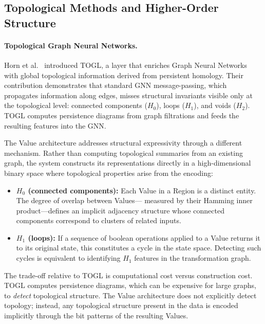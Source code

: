 \subsection{Topological Methods and Higher-Order Structure}
\label{sec:related_topological_nn}

\paragraph{Topological Graph Neural Networks.}
Horn et al.\ \citep{horn2022togl} introduced TOGL, a layer that enriches
Graph Neural Networks with global topological information derived from
persistent homology.  Their contribution demonstrates that standard GNN
message-passing, which propagates information along edges, misses
structural invariants visible only at the topological level: connected
components ($H_0$), loops ($H_1$), and voids ($H_2$).  TOGL computes
persistence diagrams from graph filtrations and feeds the resulting
features into the GNN.

The Value architecture addresses structural expressivity through a
different mechanism.  Rather than computing topological summaries from an
existing graph, the system constructs its representations directly in a
high-dimensional binary space where topological properties arise from
the encoding:

\begin{itemize}[nosep]
  \item \textbf{$H_0$ (connected components):} Each Value in a Region
        is a distinct entity.  The degree of overlap between Values---
        measured by their Hamming inner product---defines an implicit
        adjacency structure whose connected components correspond to
        clusters of related inputs.
  \item \textbf{$H_1$ (loops):} If a sequence of boolean operations
        applied to a Value returns it to its original state, this
        constitutes a cycle in the state space.  Detecting such cycles
        is equivalent to identifying $H_1$ features in the
        transformation graph.
\end{itemize}

The trade-off relative to TOGL is computational cost versus
construction cost.  TOGL computes persistence diagrams, which can be
expensive for large graphs, to \emph{detect} topological structure.
The Value architecture does not explicitly detect topology; instead,
any topological structure present in the data is encoded implicitly
through the bit patterns of the resulting Values.

